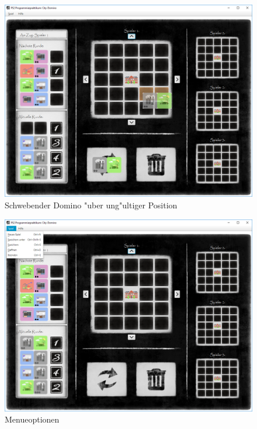 \begin{figure}
	\centering
	\includegraphics{screenshots/screenshot_HovernRot}
	\caption{Schwebender Domino "uber ung"ultiger Position}
	\label{fig:hovernRot}
\end{figure}


\newpage

\begin{figure}
	\centering
	\includegraphics{screenshots/screenshot_Menue}
	\caption{Menueoptionen}
	\label{fig:menueoptionen}
\end{figure}

